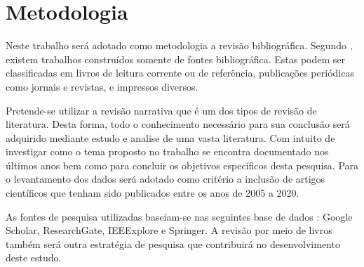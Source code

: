 \section{Metodologia}

Neste trabalho será adotado como metodologia a revisão bibliográfica. Segundo \cite{gil2002}, existem trabalhos construídos somente de fontes bibliográfica. Estas podem ser classificadas em livros de leitura corrente ou de referência, publicações periódicas como jornais e revistas, e impressos diversos.

Pretende-se utilizar a revisão narrativa que é um dos tipos de revisão de literatura. Desta forma, todo o conhecimento necessário para sua conclusão será adquirido mediante estudo e analise de uma vasta literatura. Com intuito de investigar como o tema proposto no trabalho se encontra documentado nos últimos anos bem como para concluir os objetivos específicos desta pesquisa. Para o levantamento dos dados será adotado como critério a inclusão de artigos científicos que tenham sido publicados entre os anos de 2005 a 2020.

As fontes de pesquisa utilizadas baseiam-se nas seguintes base de dados : Google Scholar, ResearchGate, IEEExplore e Springer. A revisão por meio de livros também será outra estratégia de pesquisa que contribuirá no desenvolvimento deste estudo.

